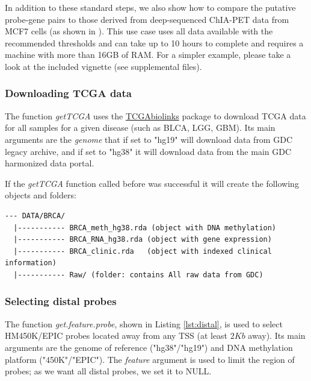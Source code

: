 In addition to these standard steps, we also show how to compare the putative probe-gene pairs to those derived from deep-sequenced ChIA-PET data from MCF7 cells (as shown in \cite{yao2015inferring}). This use case uses all data available with the recommended thresholds and can take up to 10 hours to complete and requires a machine with more than 16GB of RAM. For a simpler example, please take a look at the included vignette (see supplemental files).

\subsubsection*{Downloading TCGA data}

The function \textit{getTCGA} uses the   \href{http://bioconductor.org/packages/TCGAbiolinks/}{TCGAbiolinks}
package \cite{colaprico2015tcgabiolinks} to download TCGA data for all samples 
for a given disease (such as BLCA, LGG, GBM). Its main arguments are 
the \textit{genome}  that if set to "hg19" will download data from GDC legacy archive, and if set 
to "hg38" it will download data from the main GDC harmonized data portal.



If the \textit{getTCGA} function called before was successful it will create the following objects and folders:
\begin{verbatim}
--- DATA/BRCA/
  |----------- BRCA_meth_hg38.rda (object with DNA methylation)
  |----------- BRCA_RNA_hg38.rda (object with gene expression)
  |----------- BRCA_clinic.rda   (object with indexed clinical information)
  |----------- Raw/ (folder: contains All raw data from GDC)
\end{verbatim}

\subsubsection*{Selecting distal probes}

The function \textit{get.feature.probe}, shown in Listing \ref{lst:distal}, is used to select HM450K/EPIC probes located away from any TSS (at least $2Kb$ away).
Its main arguments are the genome of reference ("hg38"/"hg19") and DNA methylation platform ("450K"/"EPIC"). The \textit{feature} argument is used to limit the region of probes; as we want all distal probes, we set it to NULL.

